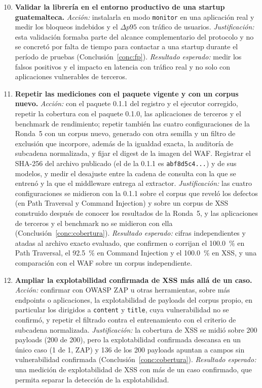 \begin{enumerate}
    \setcounter{enumi}{9}
    \item \textbf{Validar la librería en el entorno productivo de una startup guatemalteca.}
    \textit{Acción:} instalarla en modo \texttt{monitor} en una aplicación real y medir los
    bloqueos indebidos y el $\Delta p95$ con tráfico de usuarios. \textit{Justificación:} esta
    validación formaba parte del alcance complementario del protocolo y no se concretó por falta de
    tiempo para contactar a una startup durante el período de pruebas (Conclusión~\ref{conc:fp}).
    \textit{Resultado esperado:} medir los falsos positivos y el impacto en latencia con tráfico
    real y no solo con aplicaciones vulnerables de terceros.

    \item \textbf{Repetir las mediciones con el paquete vigente y con un corpus nuevo.}
    \textit{Acción:} con el paquete 0.1.1 del registro y el ejecutor corregido, repetir la cobertura con
    el paquete 0.1.0, las aplicaciones de terceros y el benchmark de rendimiento; repetir también
    las cuatro configuraciones de la Ronda~5 con un corpus nuevo, generado con otra semilla y un
    filtro de exclusión que incorpore, además de la igualdad exacta, la auditoría de subcadena
    normalizada, y fijar el digest de la imagen del WAF. Registrar el SHA-256
    del archivo publicado (el de la 0.1.1 es \texttt{abf8d5c4...}) y de sus modelos, y medir el
    desajuste entre la cadena de consulta con la que se entrenó y la que el middleware entrega al
    extractor. \textit{Justificación:} las cuatro configuraciones se midieron con la 0.1.1 sobre el corpus
    que reveló los defectos (en Path Traversal y Command Injection) y sobre un corpus de XSS
    construido después de conocer los resultados de la Ronda~5, y las aplicaciones de terceros y
    el benchmark no se midieron con ella (Conclusión~\ref{conc:cobertura}). \textit{Resultado
    esperado:} cifras independientes y atadas al archivo exacto evaluado, que confirmen o corrijan
    el 100.0~\% en Path Traversal, el 92.5~\% en Command Injection y el 100.0~\% en XSS, y una
    comparación con el WAF sobre un corpus independiente.

        \item \textbf{Ampliar la explotabilidad confirmada de XSS más allá de un caso.}
    \textit{Acción:} confirmar con OWASP ZAP u otras herramientas, sobre más endpoints o
    aplicaciones, la explotabilidad de payloads del corpus propio, en particular los dirigidos a
    \texttt{content} y \texttt{title}, cuya vulnerabilidad no se confirmó, y repetir el filtrado
    contra el entrenamiento con el criterio de subcadena normalizada. \textit{Justificación:} la
    cobertura de XSS se midió sobre 200 payloads (200 de 200), pero la explotabilidad confirmada
    descansa en un único caso (1 de 1, ZAP) y 136 de los 200 payloads apuntan a campos sin
    vulnerabilidad confirmada (Conclusión~\ref{conc:cobertura}). \textit{Resultado esperado:} una
    medición de explotabilidad de XSS con más de un caso confirmado, que permita separar la
    detección de la explotabilidad.


\end{enumerate}
